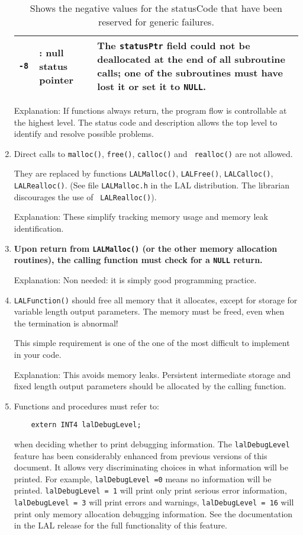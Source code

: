 \documentclass[]{ligodcc}
\renewcommand{\texttt}[1]{{\ttfamily\color{blue}#1}}
\begin{document}
\begin{enumerate}
\begin{table}
\begin{center}
\begin{tabular}{|cp{4.2cm}p{6.5cm}|}
\tt -8 & \vspace{-1.4ex}{\tt DETATCHSTATUSPTR}: null status pointer &
The {\tt statusPtr} field could not be deallocated at the end of all
subroutine calls; one of the subroutines must have lost it or set it
to {\tt NULL}. \\
\hline
\end{tabular}
\caption{Shows the negative values for the {\texttt {statusCode}} that have been
reserved for generic failures.}
\label{statusCode}
\end{center}
\end{table}


Explanation: If functions always return, the program flow is
controllable at the highest level. The status code and description
allows the top level to identify and resolve possible problems. 

\item
Direct calls to {\tt malloc()}, {\tt free()}, {\tt calloc()} and {\tt
realloc()} are not allowed.

They are replaced by functions {\tt LALMalloc()}, {\tt LALFree()},
{\tt LALCalloc()}, {\tt LALRealloc()}. (See file {\tt LALMalloc.h} in
the LAL distribution. The librarian discourages the use of {\tt
LALRealloc()}).

Explanation: These simplify tracking memory usage and memory leak
identification.

\item
{\bf Upon return from {\tt LALMalloc()} (or the other memory allocation
routines), the calling function must check for a {\tt NULL} return.}

Explanation: Non needed: it is simply good programming practice.

\item
{\tt LALFunction()} should free all memory that it allocates, except
for storage for variable length output parameters.
The memory must be freed, even when the termination is abnormal!

This simple requirement is one of the one of the most difficult to 
implement in your code.

Explanation: This avoids memory leaks. Persistent intermediate storage
and fixed length output parameters should be allocated by the calling
function.

\item
Functions and procedures must refer to: 
{\footnotesize
\begin{verbatim}
    extern INT4 lalDebugLevel;
\end{verbatim}}
when deciding whether to print debugging information. The
{\tt lalDebugLevel}  feature has been considerably enhanced from previous
versions of this document.  It allows very discriminating choices in
what information will be printed. For example, {\tt lalDebugLevel =0} means
no information will be printed. {\tt lalDebugLevel = 1} will print only
print serious error information, {\tt lalDebugLevel = 3} will print
errors and warnings, {\tt lalDebugLevel = 16} will print only memory
allocation debugging information. See the documentation in the LAL
release for the full functionality of this feature. 


\end{enumerate}
\end{document}
